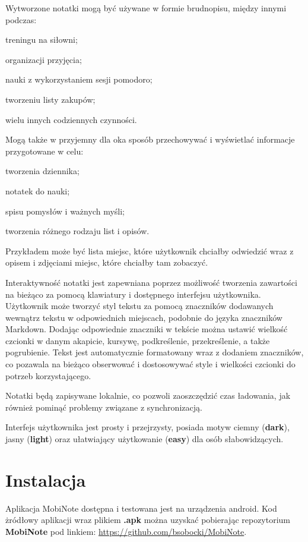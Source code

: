 \documentclass[shortabstract]{iithesis}
\begin{document}
Wytworzone notatki mogą być używane w formie brudnopisu, między innymi podczas:
\begin{compactitem}
    \item treningu na siłowni;
    \item organizacji przyjęcia;
    \item nauki z wykorzystaniem sesji pomodoro;
    \item tworzeniu listy zakupów;
    \item wielu innych codziennych czynności.
\end{compactitem}

Mogą także w przyjemny dla oka sposób przechowywać i wyświetlać informacje przygotowane w celu:
\begin{compactitem}
 \item tworzenia dziennika;
 \item notatek do nauki;
 \item spisu pomysłów i ważnych myśli;
 \item tworzenia różnego rodzaju list i opisów.
\end{compactitem}
 Przykładem może być lista miejsc, które użytkownik chciałby odwiedzić wraz z opisem i zdjęciami miejsc, które chciałby tam zobaczyć.

Interaktywność notatki jest zapewniana poprzez możliwość tworzenia zawartości na bieżąco za pomocą klawiatury i dostępnego interfejsu użytkownika.
Użytkownik może tworzyć styl tekstu za pomocą znaczników dodawanych wewnątrz tekstu w odpowiednich miejscach, podobnie do języka znaczników Markdown.
Dodając odpowiednie znaczniki w tekście można ustawić wielkość czcionki w danym akapicie, kursywę, podkreślenie, przekreślenie, a także pogrubienie.
Tekst jest automatycznie formatowany wraz z dodaniem znaczników, co pozawala na bieżąco obserwować i dostosowywać style i wielkości czcionki do potrzeb korzystającego.

Notatki będą zapisywane lokalnie, co pozwoli zaoszczędzić czas ładowania, jak również pominąć problemy związane z synchronizacją.

Interfejs użytkownika jest prosty i przejrzysty, posiada motyw ciemny (\textbf{dark}), jasny (\textbf{light}) oraz ułatwiający użytkowanie (\textbf{easy}) dla osób słabowidzących.

\chapter{Instalacja}

Aplikacja MobiNote dostępna i testowana jest na urządzenia android.
Kod żródłowy aplikacji wraz plikiem \textbf{.apk} można uzyskać pobierając repozytorium \textbf{MobiNote} pod linkiem:
\url{https://github.com/bsobocki/MobiNote}.
\end{document}
